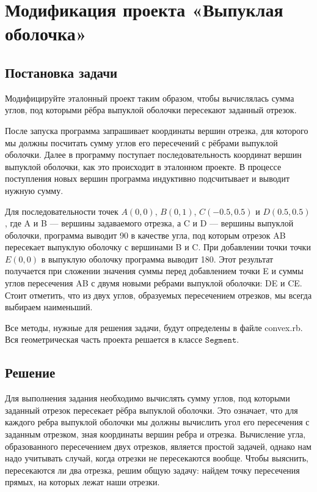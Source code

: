 \section{Модификация проекта «Выпуклая оболочка»}
\subsection*{Постановка задачи}
Модифицируйте эталонный проект таким образом, чтобы вычислялась сумма углов, под которыми рёбра выпуклой оболочки пересекают заданный отрезок.

После запуска программа запрашивает координаты вершин отрезка, для которого мы должны посчитать сумму углов его пересечений с рёбрами выпуклой оболочки. Далее в программу поступает последовательность координат вершин выпуклой оболочки, как это происходит в эталонном проекте. В процессе поступления новых вершин программа индуктивно подсчитывает и выводит нужную сумму.

Для последовательности точек $A(0,0)$, $B(0,1)$, $C(-0.5,0.5)$ и $D(0.5,0.5)$, где A и B —
 вершины задаваемого отрезка, а C и D —
 вершины выпуклой оболочки, программа выводит 90 в качестве угла, под которым отрезок AB пересекает выпуклую оболочку с вершинами B и C. При добавлении точки точки $E(0,0)$ в выпуклую оболочку программа выводит 180. Этот результат получается при  сложении значения суммы перед добавлением точки E и суммы углов пересечения AB с двумя новыми ребрами выпуклой оболочки: DE и CE. Стоит отметить, что из двух углов, образуемых пересечением отрезков, мы всегда выбираем наименьший.

Все методы, нужные для решения задачи, будут определены в файле convex.rb. Вся геометрическая часть проекта решается в классе $\texttt{Segment}$.

\subsection*{Решение}

Для выполнения задания необходимо вычислять сумму углов, под которыми заданный отрезок пересекает рёбра выпуклой оболочки. Это означает, что для каждого ребра выпуклой оболочки мы должны вычислить угол его пересечения с заданным отрезком, зная координаты вершин ребра и отрезка. Вычисление угла, образованного пересечением двух отрезков, является простой задачей, однако нам надо учитывать случай, когда отрезки не пересекаются вообще. Чтобы выяснить, пересекаются ли два отрезка, решим общую задачу: найдем точку пересечения прямых, на которых лежат наши отрезки. 

